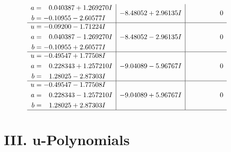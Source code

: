 \documentclass[1p]{elsarticle_modified}
\theoremstyle{definition}
\begin{document}
$$\begin{array}{c|c|c}
\begin{aligned}
a &= \phantom{-}0.040387 + 1.269270 I \\
b &= -0.10955 - 2.60577 I\end{aligned}
 & -8.48052 + 2.96135 I & \phantom{-0.000000 } 0 \\ \hline\begin{aligned}
u &= -0.09200 - 1.71224 I \\
a &= \phantom{-}0.040387 - 1.269270 I \\
b &= -0.10955 + 2.60577 I\end{aligned}
 & -8.48052 - 2.96135 I & \phantom{-0.000000 } 0 \\ \hline\begin{aligned}
u &= -0.49547 + 1.77508 I \\
a &= \phantom{-}0.228343 + 1.257210 I \\
b &= \phantom{-}1.28025 - 2.87303 I\end{aligned}
 & -9.04089 - 5.96767 I & \phantom{-0.000000 } 0 \\ \hline\begin{aligned}
u &= -0.49547 - 1.77508 I \\
a &= \phantom{-}0.228343 - 1.257210 I \\
b &= \phantom{-}1.28025 + 2.87303 I\end{aligned}
 & -9.04089 + 5.96767 I & \phantom{-0.000000 } 0\\
 \hline 
 \end{array}$$\newpage
\newpage\renewcommand{\arraystretch}{1}
\centering \section*{ III. u-Polynomials}
\end{document}
